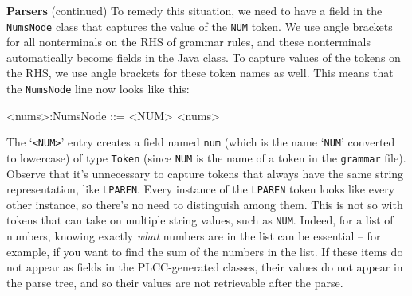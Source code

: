 \begin{minipage}[t]{\sw}
\slidenumber
\LARGE
{\bf Parsers} (continued)\exx
To remedy this situation, we need to have a field
in the \verb'NumsNode' class that captures the value
of the \verb'NUM' token.
We use angle brackets for all nonterminals on the RHS of grammar rules,
and these nonterminals automatically become fields in the Java class.
To capture values of the tokens on the RHS,
we use angle brackets for these token names as well.
This means that the \verb'NumsNode' line now looks like this:
\begin{qv}
<nums>:NumsNode  ::= <NUM> <nums>
\end{qv}
The `\verb'<NUM>'' entry creates a field named \verb'num'
(which is the name `\verb'NUM'' converted to lowercase)
of type \verb'Token' (since \verb'NUM' is the name of a token 
in the \verb'grammar' file).\exx
Observe that it's unnecessary
to capture tokens that always have the same string representation,
like \verb'LPAREN'.
Every instance of the \verb'LPAREN' token
looks like every other instance,
so there's no need to distinguish among them.
This is not so with tokens that can take on multiple string values,
such as \verb'NUM'.
Indeed, for a list of numbers,
knowing exactly {\em what} numbers are in the list
can be essential --
for example, if you want to find the sum of the numbers in the list.
If these items do not appear as fields in the PLCC-generated classes,
their values do not appear in the parse tree,
and so their values are not retrievable after the parse.
\end{minipage}
\clearpage
